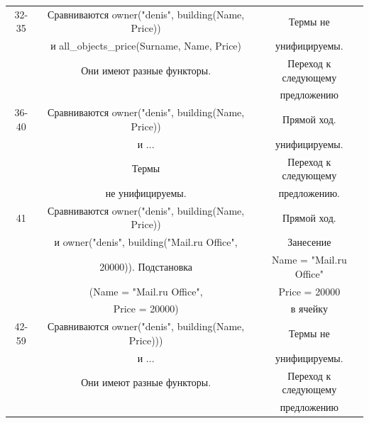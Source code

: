 \documentclass[12pt]{report}
\begin{document}
\begin{table}[H]
	\begin{center}
		\begin{tabular}{|c c c |} 
			32-35 & Сравниваются owner("denis", building(Name, Price)) & Термы не \\
			  & и all\_objects\_price(Surname, Name, Price) & унифицируемы. \\
			  & Они имеют разные функторы. &Переход к следующему \\
			  & & предложению\\		
			\hline
			36-40 & Сравниваются  owner("denis", building(Name, Price)) & Прямой ход. \\
			  & и ... & унифицируемы. \\
		      &  Термы   & Переход к следующему \\
			  & не унифицируемы. & предложению. \\
			\hline
			41 & Сравниваются owner("denis", building(Name, Price)) & Прямой ход. \\
			  & и owner("denis", building("Mail.ru Office", & Занесение \\
			  &  20000)). Подстановка & Name = "Mail.ru Office" \\
			  & (Name = "Mail.ru Office", & Price = 20000\\
			  & Price = 20000) & в ячейку\\

			\hline
			42-59 & Сравниваются owner("denis", building(Name, Price))) & Термы не \\
			  & и ... & унифицируемы. \\
			  & Они имеют разные функторы. &Переход к следующему \\
			  & & предложению\\
\hline
\end{tabular}
	\end{center}
\end{table}
\end{document}

